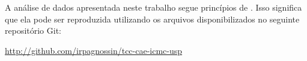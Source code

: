 \section{}
\label{ap:rr}

A análise de dados apresentada neste trabalho segue princípios de  \cite{Peng2011}. Isso significa que ela pode ser reproduzida utilizando os arquivos disponibilizados no seguinte repositório Git:

\begin{center}
	\url{http://github.com/irpagnossin/tcc-cae-icmc-usp}
\end{center}
